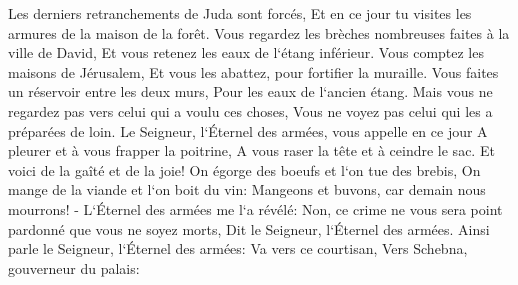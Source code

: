 \verse Les derniers retranchements de Juda sont forcés, Et en ce jour tu visites les armures de la maison de la forêt. 
\verse Vous regardez les brèches nombreuses faites à la ville de David, Et vous retenez les eaux de l`étang inférieur. 
\verse Vous comptez les maisons de Jérusalem, Et vous les abattez, pour fortifier la muraille. 
\verse Vous faites un réservoir entre les deux murs, Pour les eaux de l`ancien étang. Mais vous ne regardez pas vers celui qui a voulu ces choses, Vous ne voyez pas celui qui les a préparées de loin. 
\verse Le Seigneur, l`Éternel des armées, vous appelle en ce jour A pleurer et à vous frapper la poitrine, A vous raser la tête et à ceindre le sac. 
\verse Et voici de la gaîté et de la joie! On égorge des boeufs et l`on tue des brebis, On mange de la viande et l`on boit du vin: Mangeons et buvons, car demain nous mourrons! - 
\verse L`Éternel des armées me l`a révélé: Non, ce crime ne vous sera point pardonné que vous ne soyez morts, Dit le Seigneur, l`Éternel des armées. 
\verse Ainsi parle le Seigneur, l`Éternel des armées: Va vers ce courtisan, Vers Schebna, gouverneur du palais: 
